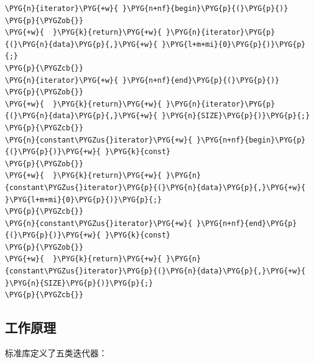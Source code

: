 \begin{itemize}
\begin{codeblockbg}
\begin{Verbatim}[commandchars=\\\{\},breaklines=true,breakanywhere=true,fontsize=\codefont,xleftmargin=17bp]
\PYG{n}{iterator}\PYG{+w}{ }\PYG{n+nf}{begin}\PYG{p}{(}\PYG{p}{)}
\PYG{p}{\PYGZob{}}
\PYG{+w}{  }\PYG{k}{return}\PYG{+w}{ }\PYG{n}{iterator}\PYG{p}{(}\PYG{n}{data}\PYG{p}{,}\PYG{+w}{ }\PYG{l+m+mi}{0}\PYG{p}{)}\PYG{p}{;}
\PYG{p}{\PYGZcb{}}
\PYG{n}{iterator}\PYG{+w}{ }\PYG{n+nf}{end}\PYG{p}{(}\PYG{p}{)}
\PYG{p}{\PYGZob{}}
\PYG{+w}{  }\PYG{k}{return}\PYG{+w}{ }\PYG{n}{iterator}\PYG{p}{(}\PYG{n}{data}\PYG{p}{,}\PYG{+w}{ }\PYG{n}{SIZE}\PYG{p}{)}\PYG{p}{;}
\PYG{p}{\PYGZcb{}}
\PYG{n}{constant\PYGZus{}iterator}\PYG{+w}{ }\PYG{n+nf}{begin}\PYG{p}{(}\PYG{p}{)}\PYG{+w}{ }\PYG{k}{const}
\PYG{p}{\PYGZob{}}
\PYG{+w}{  }\PYG{k}{return}\PYG{+w}{ }\PYG{n}{constant\PYGZus{}iterator}\PYG{p}{(}\PYG{n}{data}\PYG{p}{,}\PYG{+w}{ }\PYG{l+m+mi}{0}\PYG{p}{)}\PYG{p}{;}
\PYG{p}{\PYGZcb{}}
\PYG{n}{constant\PYGZus{}iterator}\PYG{+w}{ }\PYG{n+nf}{end}\PYG{p}{(}\PYG{p}{)}\PYG{+w}{ }\PYG{k}{const}
\PYG{p}{\PYGZob{}}
\PYG{+w}{  }\PYG{k}{return}\PYG{+w}{ }\PYG{n}{constant\PYGZus{}iterator}\PYG{p}{(}\PYG{n}{data}\PYG{p}{,}\PYG{+w}{ }\PYG{n}{SIZE}\PYG{p}{)}\PYG{p}{;}
\PYG{p}{\PYGZcb{}}
\end{Verbatim}
\end{codeblockbg}

\end{itemize}



\subsection{工作原理}



标准库定义了五类迭代器：



